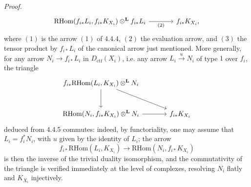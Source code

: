 \documentclass[11pt]{article}
\newenvironment{prooftext}[1][Proof]{\par\noindent\emph{#1.}\ }{\par\medskip}
\providecommand{\RHom}{\mathrm{RHom}}
\providecommand{\Dctf}{D_{\mathrm{ctf}}}
\providecommand{\Dctf}{D_{\mathrm{ctf}}}
\providecommand{\RHom}{\mathrm{RHom}}
\providecommand{\RHom}{\mathrm R\mathcal{H}om}
\begin{document}
\begin{prooftext}[Proof]
\begin{equation}
\begin{tikzcd}[column sep=large,row sep=large]
\RHom(f_{i*}L_i,f_{i*}K_{X_i})\otimes^{\mathbf L} f_{i*}L_i
 \arrow[r,"(2)"'] &
f_{i*}K_{X_i},
\end{tikzcd}
\end{equation}
where $(1)$ is the arrow $(1)$ of 4.4.4, $(2)$ the evaluation arrow, and $(3)$ the tensor product by $f_{i*}L_i$ of the canonical arrow just mentioned. More generally, for any arrow $N_i\longrightarrow f_{i*}L_i$ in $\Dctf(X_i)$, i.e. any arrow $L_i\xrightarrow{u}N_i$ of type $1$ over $f_i$, the triangle
\[
\begin{tikzcd}[column sep=large,row sep=large]
f_{i*}\RHom(L_i,K_{X_i})\otimes^{\mathbf L}N_i
 \arrow[dr] \arrow[d] & \\
\RHom(N_i,f_{i*}K_{X_i})\otimes^{\mathbf L}N_i \arrow[r] &
f_{i*}K_{X_i}
\end{tikzcd}
\]
deduced from 4.4.5 commutes: indeed, by functoriality, one may assume that $L_i=f_i^*N_i$, with $u$ given by the identity of $L_i$; the arrow
\[
f_{i*}\RHom(L_i,K_{X_i})\longrightarrow\RHom(N_i,f_{i*}K_{X_i})
\]
is then the inverse of the trivial duality isomorphism, and the commutativity of the triangle is verified immediately at the level of complexes, resolving $N_i$ flatly and $K_{X_i}$ injectively.


\end{prooftext}
\end{document}
